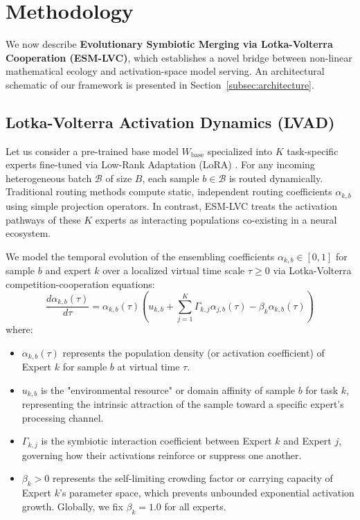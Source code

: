 \section{Methodology}
\label{sec:methodology}

We now describe \textbf{Evolutionary Symbiotic Merging via Lotka-Volterra Cooperation (ESM-LVC)}, which establishes a novel bridge between non-linear mathematical ecology and activation-space model serving. An architectural schematic of our framework is presented in Section~\ref{subsec:architecture}.

\subsection{Lotka-Volterra Activation Dynamics (LVAD)}
\label{subsec:lvad}
Let us consider a pre-trained base model $W_{\text{base}}$ specialized into $K$ task-specific experts fine-tuned via Low-Rank Adaptation (LoRA) \cite{hu2021lora}. For any incoming heterogeneous batch $\mathcal{B}$ of size $B$, each sample $b \in \mathcal{B}$ is routed dynamically. Traditional routing methods compute static, independent routing coefficients $\alpha_{k, b}$ using simple projection operators. In contrast, ESM-LVC treats the activation pathways of these $K$ experts as interacting populations co-existing in a neural ecosystem.

We model the temporal evolution of the ensembling coefficients $\alpha_{k, b} \in [0, 1]$ for sample $b$ and expert $k$ over a localized virtual time scale $\tau \geq 0$ via Lotka-Volterra competition-cooperation equations:
\begin{equation}
    \frac{d \alpha_{k, b}(\tau)}{d \tau} = \alpha_{k, b}(\tau) \left( u_{k, b} + \sum_{j=1}^K \Gamma_{k, j} \alpha_{j, b}(\tau) - \beta_k \alpha_{k, b}(\tau) \right)
\end{equation}
where:
\begin{itemize}
    \item $\alpha_{k, b}(\tau)$ represents the population density (or activation coefficient) of Expert $k$ for sample $b$ at virtual time $\tau$.
    \item $u_{k, b}$ is the "environmental resource" or domain affinity of sample $b$ for task $k$, representing the intrinsic attraction of the sample toward a specific expert's processing channel.
    \item $\Gamma_{k, j}$ is the symbiotic interaction coefficient between Expert $k$ and Expert $j$, governing how their activations reinforce or suppress one another.
    \item $\beta_k > 0$ represents the self-limiting crowding factor or carrying capacity of Expert $k$'s parameter space, which prevents unbounded exponential activation growth. Globally, we fix $\beta_k = 1.0$ for all experts.
\end{itemize}

